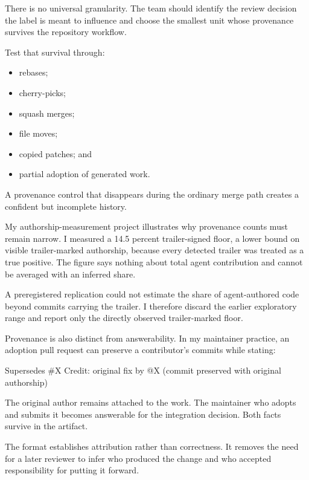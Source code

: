 There is no universal granularity. The team should identify the review decision the label is meant to influence and choose the smallest unit whose provenance survives the repository workflow.


Test that survival through:

\begin{itemize}
\tightlist
\item
  rebases;
\item
  cherry-picks;
\item
  squash merges;
\item
  file moves;
\item
  copied patches; and
\item
  partial adoption of generated work.
\end{itemize}

A provenance control that disappears during the ordinary merge path creates a confident but incomplete history.

My authorship-measurement project illustrates why provenance counts must remain narrow. I measured a 14.5 percent trailer-signed floor, a lower bound on visible trailer-marked authorship, because every detected trailer was treated as a true positive. The figure says nothing about total agent contribution and cannot be averaged with an inferred share.

A preregistered replication could not estimate the share of agent-authored code beyond commits carrying the trailer. I therefore discard the earlier exploratory range and report only the directly observed trailer-marked floor.

Provenance is also distinct from answerability. In my maintainer practice, an adoption pull request can preserve a contributor's commits while stating:

\begin{record}
\begin{recordbody}
Supersedes #X
Credit: original fix by @X (commit preserved with original authorship)
\end{recordbody}
\end{record}

The original author remains attached to the work. The maintainer who adopts and submits it becomes answerable for the integration decision. Both facts survive in the artifact.

The format establishes attribution rather than correctness. It removes the need for a later reviewer to infer who produced the change and who accepted responsibility for putting it forward.

